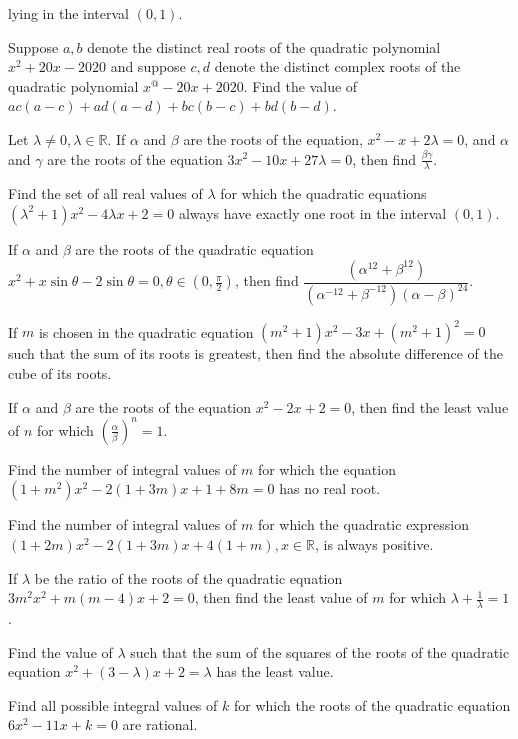   lying in the interval $(0, 1)$.
\item Suppose $a, b$ denote the distinct real roots of the quadratic polynomial $x^2 + 20x - 2020$ and
  suppose $c, d$ denote the distinct complex roots of the quadratic polynomial $x^@ - 20x + 2020$. Find the
  value of $ac(a - c) + ad(a - d) + bc(b - c) + bd(b - d)$.
\item Let $\lambda\neq 0, \lambda\in\mathbb{R}$. If $\alpha$ and $\beta$ are the roots of the equation, $x^2
  - x + 2\lambda = 0$, and $\alpha$ and $\gamma$ are the roots of the equation $3x^2 - 10x + 27\lambda = 0$,
  then find $\frac{\beta\gamma}{\lambda}$.
\item Find the set of all real values of $\lambda$ for which the quadratic equations $\left(\lambda^2 +
  1\right)x^2 - 4\lambda x + 2 = 0$ always have exactly one root in the interval $(0, 1)$.
\item If $\alpha$ and $\beta$ are the roots of the quadratic equation $x^2 + x\sin\theta - 2\sin\theta = 0,
  \theta\in\left(0, \frac{\pi}{2}\right)$, then find $\dfrac{\left(\alpha^{12} +
    \beta^{12}\right)}{\left(\alpha^{-12} + \beta^{-12}\right)(\alpha - \beta)^{24}}$.
\item If $m$ is chosen in the quadratic equation $\left(m^2 + 1\right)x^2 - 3x + \left(m^2 + 1\right)^2 = 0$
  such that the sum of its roots is greatest, then find the absolute difference of the cube of its roots.
\item If $\alpha$ and $\beta$ are the roots of the equation $x^2 - 2x + 2 = 0$, then find the least value of
  $n$ for which $\left(\frac{\alpha}{\beta}\right)^n = 1$.
\item Find the number of integral values of $m$ for which the equation $\left(1 + m^2\right)x^2 - 2(1 + 3m)x
  + 1 + 8m = 0$ has no real root.
\item Find the number of integral values of $m$ for which the quadratic expression $(1 + 2m)x^2 - 2(1 + 3m)x
  + 4(1 + m), x\in\mathbb{R}$, is always positive.
\item If $\lambda$ be the ratio of the roots of the quadratic equation $3m^2x^2 + m(m - 4)x + 2 = 0$, then
  find the least value of $m$ for which $\lambda + \frac{1}{\lambda} = 1$.
\item Find the value of $\lambda$ such that the sum of the squares of the roots of the quadratic equation
  $x^2 + (3 - \lambda)x + 2 = \lambda$ has the least value.
\item Find all possible integral values of $k$ for which the roots of the quadratic equation $6x^2 - 11x +
  k= 0$ are rational.
\stopitemize

